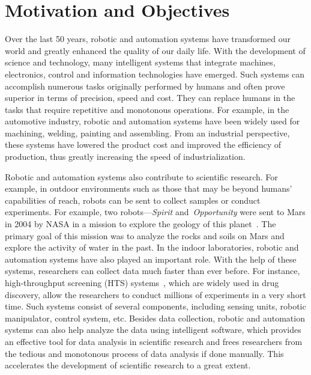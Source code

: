 \section{Motivation and Objectives}

Over the last 50 years, robotic and automation systems have transformed our world and greatly enhanced the quality of our daily life. With the development of science and technology, many intelligent systems that integrate machines, electronics, control and information technologies have emerged. Such systems can accomplish numerous tasks originally performed by humans and often prove superior in terms of precision, speed and cost. They can replace humans in the tasks that require repetitive and monotonous operations. For example, in the automotive industry, robotic and automation systems have been widely used for machining, welding, painting and assembling. From an industrial perspective, these systems have lowered the product cost and improved the efficiency of production, thus greatly increasing the speed of industrialization. 

Robotic and automation systems also contribute to scientific research. For example, in outdoor environments such as those that may be beyond humans' capabilities of reach, robots can be sent to collect samples or conduct experiments. For example, two robots---\textit{Spirit} and~\textit{Opportunity} were sent to Mars in 2004 by NASA in a mission to explore the geology of this planet~\cite{Grotzinger:Sci:2014}. The primary goal of this mission was to analyze the rocks and soils on Mars and explore the activity of water in the past. In the indoor laboratories, robotic and automation systems have also played an important role. With the help of these systems, researchers can collect data much faster than ever before. For instance, high-throughput screening (HTS) systems~\cite{Hertzberg2000}, which are widely used in drug discovery, allow the researchers to conduct millions of experiments in a very short time. Such systems consist of several components, including sensing units, robotic manipulator, control system, etc. Besides data collection, robotic and automation systems can also help analyze the data using intelligent software, which provides an effective tool for data analysis in scientific research and frees researchers from the tedious and monotonous process of data analysis if done manually. This accelerates the development of scientific research to a great extent. 

